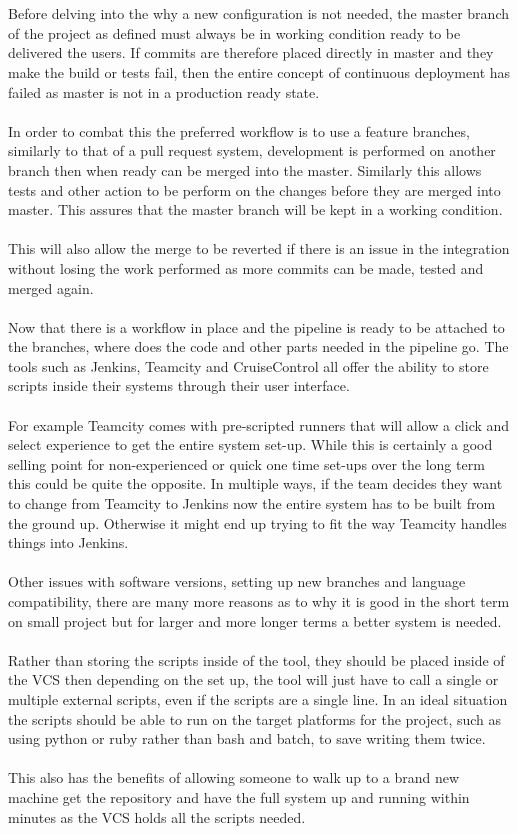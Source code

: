 \\\\
Before delving into the why a new configuration is not needed, the master branch of the project as defined must always be in working condition ready to be delivered the users. If commits are therefore placed directly in master and they make the build or tests fail, then the entire concept of continuous deployment has failed as master is not in a  production ready state.
\\\\
In order to combat this the preferred workflow is to use a feature branches, similarly to that of a pull request system, development is performed on another branch then when ready can be merged into the master. Similarly this allows tests and other action to be perform on the changes before they are merged into master. This assures that the master branch will be kept in a working condition.
\\\\
This will also allow the merge to be reverted if there is an issue in the integration without losing the work performed as more commits can be made, tested and merged again.
\\\\
Now that there is a workflow in place and the pipeline is ready to be attached to the branches, where does the code and other parts needed in the pipeline go. The tools such as Jenkins, Teamcity and CruiseControl all offer the ability to store scripts inside their systems through their user interface.
\\\\
For example Teamcity comes with pre-scripted runners that will allow a click and select experience to get the entire system set-up. While this is certainly a good selling point for non-experienced or quick one time set-ups over the long term this could be quite the opposite. In multiple ways, if the team decides they want to change from Teamcity to Jenkins now the entire system has to be built from the ground up. Otherwise it might end up trying to fit the way Teamcity handles things into Jenkins.
\\\\
Other issues with software versions, setting up new branches and language compatibility, there are many more reasons as to why it is good in the short term on small project but for larger and more longer terms a better system is needed.
\\\\
Rather than storing the scripts inside of the tool, they should be placed inside of the VCS then depending on the set up, the tool will just have to call a single or multiple external scripts, even if the scripts are a single line. In an ideal situation the scripts should be able to run on the target platforms for the project, such as using python or ruby rather than bash and batch, to save writing them twice.
\\\\
This also has the benefits of allowing someone to walk up to a brand new machine get the repository and have the full system up and running within minutes as the VCS holds all the scripts needed.

